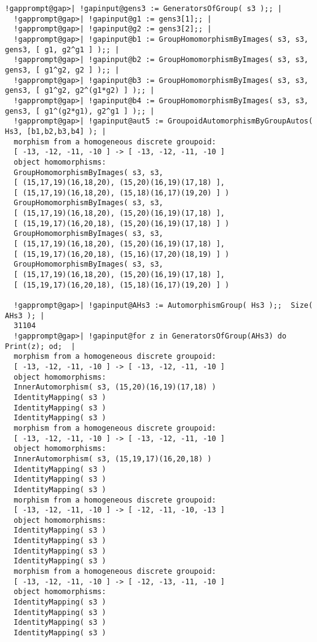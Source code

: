 \documentclass[a4paper,11pt]{report}
\begin{document}
{{{\begin{Verbatim}[commandchars=!@|,fontsize=\small,frame=single,label=Example]
  !gapprompt@gap>| !gapinput@gens3 := GeneratorsOfGroup( s3 );; |
  !gapprompt@gap>| !gapinput@g1 := gens3[1];; |
  !gapprompt@gap>| !gapinput@g2 := gens3[2];; |
  !gapprompt@gap>| !gapinput@b1 := GroupHomomorphismByImages( s3, s3, gens3, [ g1, g2^g1 ] );; |
  !gapprompt@gap>| !gapinput@b2 := GroupHomomorphismByImages( s3, s3, gens3, [ g1^g2, g2 ] );; |
  !gapprompt@gap>| !gapinput@b3 := GroupHomomorphismByImages( s3, s3, gens3, [ g1^g2, g2^(g1*g2) ] );; |
  !gapprompt@gap>| !gapinput@b4 := GroupHomomorphismByImages( s3, s3, gens3, [ g1^(g2*g1), g2^g1 ] );; |
  !gapprompt@gap>| !gapinput@aut5 := GroupoidAutomorphismByGroupAutos( Hs3, [b1,b2,b3,b4] ); |
  morphism from a homogeneous discrete groupoid:
  [ -13, -12, -11, -10 ] -> [ -13, -12, -11, -10 ]
  object homomorphisms:
  GroupHomomorphismByImages( s3, s3, 
  [ (15,17,19)(16,18,20), (15,20)(16,19)(17,18) ], 
  [ (15,17,19)(16,18,20), (15,18)(16,17)(19,20) ] )
  GroupHomomorphismByImages( s3, s3, 
  [ (15,17,19)(16,18,20), (15,20)(16,19)(17,18) ], 
  [ (15,19,17)(16,20,18), (15,20)(16,19)(17,18) ] )
  GroupHomomorphismByImages( s3, s3, 
  [ (15,17,19)(16,18,20), (15,20)(16,19)(17,18) ], 
  [ (15,19,17)(16,20,18), (15,16)(17,20)(18,19) ] )
  GroupHomomorphismByImages( s3, s3, 
  [ (15,17,19)(16,18,20), (15,20)(16,19)(17,18) ], 
  [ (15,19,17)(16,20,18), (15,18)(16,17)(19,20) ] )
  
  !gapprompt@gap>| !gapinput@AHs3 := AutomorphismGroup( Hs3 );;  Size( AHs3 ); |
  31104
  !gapprompt@gap>| !gapinput@for z in GeneratorsOfGroup(AHs3) do Print(z); od;  |
  morphism from a homogeneous discrete groupoid:
  [ -13, -12, -11, -10 ] -> [ -13, -12, -11, -10 ]
  object homomorphisms:
  InnerAutomorphism( s3, (15,20)(16,19)(17,18) )
  IdentityMapping( s3 )
  IdentityMapping( s3 )
  IdentityMapping( s3 )
  morphism from a homogeneous discrete groupoid:
  [ -13, -12, -11, -10 ] -> [ -13, -12, -11, -10 ]
  object homomorphisms:
  InnerAutomorphism( s3, (15,19,17)(16,20,18) )
  IdentityMapping( s3 )
  IdentityMapping( s3 )
  IdentityMapping( s3 )
  morphism from a homogeneous discrete groupoid:
  [ -13, -12, -11, -10 ] -> [ -12, -11, -10, -13 ]
  object homomorphisms:
  IdentityMapping( s3 )
  IdentityMapping( s3 )
  IdentityMapping( s3 )
  IdentityMapping( s3 )
  morphism from a homogeneous discrete groupoid:
  [ -13, -12, -11, -10 ] -> [ -12, -13, -11, -10 ]
  object homomorphisms:
  IdentityMapping( s3 )
  IdentityMapping( s3 )
  IdentityMapping( s3 )
  IdentityMapping( s3 )
  
\end{Verbatim}
 

 }

 }

 }
\end{document}
